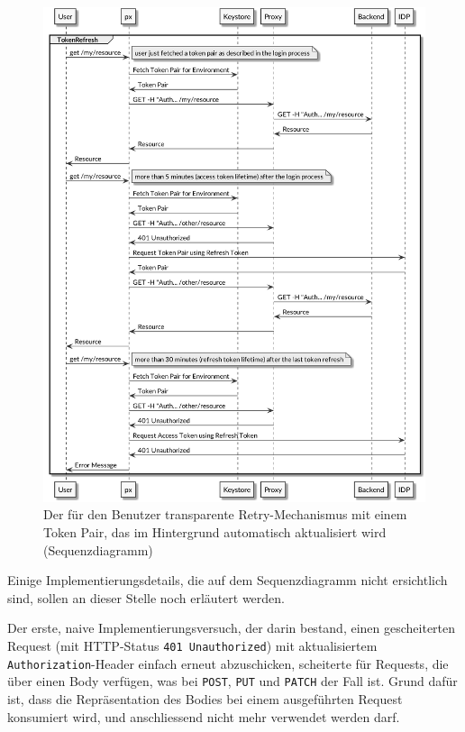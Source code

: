\begin{figure}
    \centering
    \includegraphics[width=\linewidth]{pics/sequence-retry.png}
    \caption{Der für den Benutzer transparente Retry-Mechanismus mit einem Token Pair, das im Hintergrund automatisch aktualisiert wird (Sequenzdiagramm)}
    \label{fig:retry-mechanism}
\end{figure}

Einige Implementierungsdetails, die auf dem Sequenzdiagramm nicht ersichtlich sind, sollen an dieser Stelle noch erläutert werden.

Der erste, naive Implementierungsversuch, der darin bestand, einen gescheiterten Request (mit HTTP-Status \texttt{401 Unauthorized}) mit aktualisiertem \texttt{Authorization}-Header einfach erneut abzuschicken, scheiterte für Requests, die über einen Body verfügen, was bei \texttt{POST}, \texttt{PUT} und \texttt{PATCH} der Fall ist. Grund dafür ist, dass die Repräsentation des Bodies bei einem ausgeführten Request konsumiert wird, und anschliessend nicht mehr verwendet werden darf.

